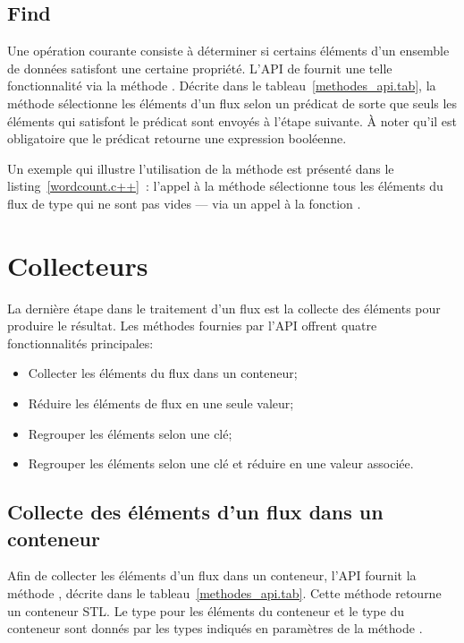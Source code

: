 \subsection{Find}
Une op\'eration courante consiste \`a d\'eterminer si certains \'el\'ements d'un ensemble de donn\'ees satisfont une certaine propri\'et\'e. L'API de  fournit une telle fonctionnalit\'e via la m\'ethode . D\'ecrite dans le tableau~\ref{methodes_api.tab}, la m\'ethode  s\'electionne les \'el\'ements d'un flux selon un pr\'edicat de sorte que seuls les \'el\'ements qui  satisfont le pr\'edicat sont envoy\'es \`a l'\'etape suivante. \`A noter qu'il est obligatoire que le pr\'edicat retourne une expression bool\'eenne. 

Un exemple qui illustre l'utilisation de la m\'ethode  est pr\'esent\'e dans le listing~\ref{wordcount.c++}~: l'appel \`a la m\'ethode   s\'electionne tous les \'el\'ements du flux de type  qui ne sont pas vides --- via un appel \`a la fonction .


\section{Collecteurs}

La derni\`ere \'etape dans le traitement d'un flux est la collecte des \'el\'ements pour produire le r\'esultat. Les m\'ethodes fournies par l'API offrent quatre fonctionnalit\'es principales: 


\begin{itemize}
	\item Collecter les \'el\'ements du flux dans un conteneur;	

	\item R\'eduire les \'el\'ements de flux en une seule valeur;

	\item Regrouper les \'el\'ements selon une cl\'e;
	
	\item Regrouper les \'el\'ements selon une cl\'e et r\'eduire en une valeur associ\'ee.
\end{itemize}


\subsection{Collecte des \'el\'ements d'un flux dans un conteneur}

Afin de collecter les \'el\'ements d'un flux dans un conteneur, l'{API} fournit la m\'ethode , d\'ecrite dans le tableau~\ref{methodes_api.tab}. Cette m\'ethode retourne un conteneur {STL}. Le type pour les \'el\'ements du conteneur et le type du conteneur sont donn\'es par les types indiqu\'es en param\`etres  de la m\'ethode . 

